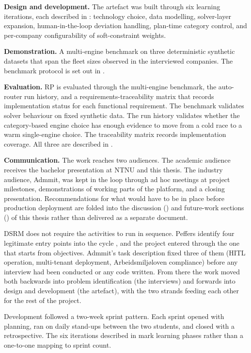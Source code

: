 \textbf{Design and development.} The artefact was built through six learning iterations, each described in : technology choice, data modelling, solver-layer expansion, human-in-the-loop deviation handling, plan-time category control, and per-company configurability of soft-constraint weights.

\textbf{Demonstration.} A multi-engine benchmark on three deterministic synthetic datasets that span the fleet sizes observed in the interviewed companies. The benchmark protocol is set out in .

\textbf{Evaluation.} RP is evaluated through the multi-engine benchmark, the auto-router run history, and a requirements-traceability matrix that records implementation status for each functional requirement. The benchmark validates solver behaviour on fixed synthetic data. The run history validates whether the category-based engine choice has enough evidence to move from a cold race to a warm single-engine choice. The traceability matrix records implementation coverage. All three are described in .

\textbf{Communication.} The work reaches two audiences. The academic audience receives the bachelor presentation at NTNU and this thesis. The industry audience, Admmit, was kept in the loop through ad hoc meetings at project milestones, demonstrations of working parts of the platform, and a closing presentation. Recommendations for what would have to be in place before production deployment are folded into the discussion () and future-work sections () of this thesis rather than delivered as a separate document.

DSRM does not require the activities to run in sequence. Peffers identify four legitimate entry points into the cycle \parencite[p.~56]{peffers2007dsrm}, and the project entered through the one that starts from objectives. Admmit's task description fixed three of them (HITL operation, multi-tenant deployment, Arbeidsmiljøloven compliance) before any interview had been conducted or any code written. From there the work moved both backwards into problem identification (the interviews) and forwards into design and development (the artefact), with the two strands feeding each other for the rest of the project.

Development followed a two-week sprint pattern. Each sprint opened with planning, ran on daily stand-ups between the two students, and closed with a retrospective. The six iterations described in  mark learning phases rather than a one-to-one mapping to sprint count.


